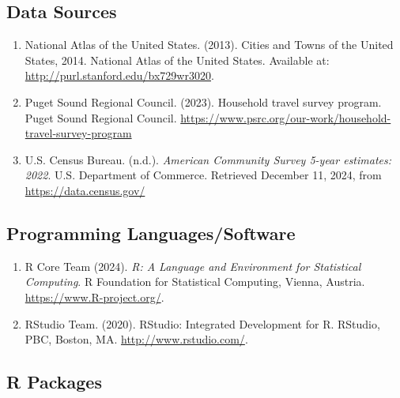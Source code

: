 \documentclass[
]{article}
\providecommand{\tightlist}{%
  \setlength{\itemsep}{0pt}\setlength{\parskip}{0pt}}
\begin{document}
\subsection{Data Sources}\label{data-sources-1}

\begin{enumerate}
\def\labelenumi{\arabic{enumi}.}
\tightlist
\item
  National Atlas of the United States. (2013). Cities and Towns of the
  United States, 2014. National Atlas of the United States. Available
  at: \url{http://purl.stanford.edu/bx729wr3020}.
\item
  Puget Sound Regional Council. (2023). Household travel survey program.
  Puget Sound Regional Council.
  \url{https://www.psrc.org/our-work/household-travel-survey-program}
\item
  U.S. Census Bureau. (n.d.). \emph{American Community Survey 5-year
  estimates: 2022}. U.S. Department of Commerce. Retrieved December 11,
  2024, from \url{https://data.census.gov/}
\end{enumerate}

\subsection{Programming
Languages/Software}\label{programming-languagessoftware}

\begin{enumerate}
\def\labelenumi{\arabic{enumi}.}
\tightlist
\item
  R Core Team (2024). \emph{R: A Language and Environment for
  Statistical Computing}. R Foundation for Statistical Computing,
  Vienna, Austria. \url{https://www.R-project.org/}.
\item
  RStudio Team. (2020). RStudio: Integrated Development for R. RStudio,
  PBC, Boston, MA. \url{http://www.rstudio.com/}.
\end{enumerate}

\subsection{R Packages}\label{r-packages}
\end{document}
